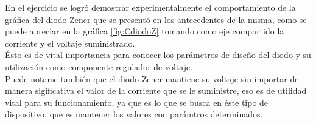 En el ejercicio se logró demostrar experimentalmente el comportamiento de la gráfica del diodo Zener que se presentó en los antecedentes de la misma, como se puede apreciar en la gráfica \ref{fig:CdiodoZ} tomando como eje compartido la corriente y el voltaje suministrado.\\

Ésto es de vital importancia para conocer los parámetros de diseño del diodo y su utilización como componente regulador de voltaje.\\

Puede notarse también que el diodo Zener mantiene su voltaje sin importar de manera sigificativa el valor de la corriente que se le suministre, eso es de utilidad vital para su funcionamiento, ya que es lo que se busca en éste tipo de dispositivo, que es mantener los valores con parámtros determinados.\\






